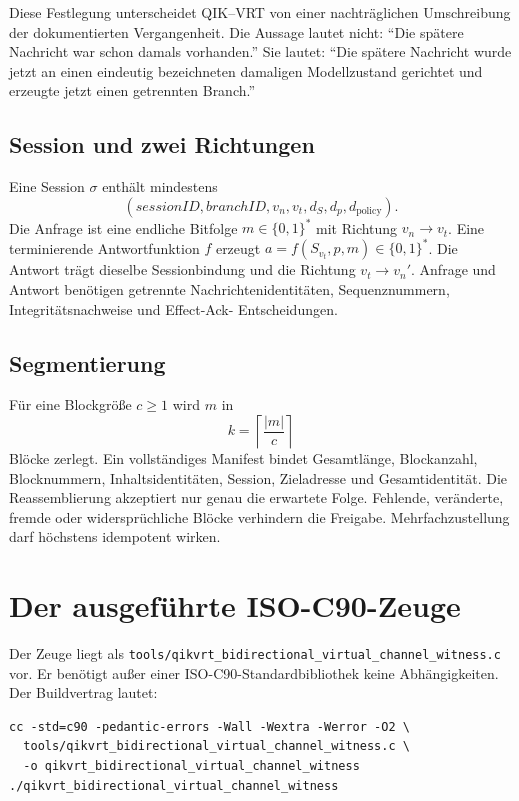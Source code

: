 \documentclass[11pt,a4paper]{article}
\theoremstyle{remark}
\newcommand{\bytes}{\{0,1\}^{*}}
\begin{document}
Diese Festlegung unterscheidet QIK--VRT von einer nachträglichen Umschreibung
der dokumentierten Vergangenheit. Die Aussage lautet nicht: ``Die spätere
Nachricht war schon damals vorhanden.'' Sie lautet: ``Die spätere Nachricht
wurde jetzt an einen eindeutig bezeichneten damaligen Modellzustand gerichtet
und erzeugte jetzt einen getrennten Branch.''

\subsection{Session und zwei Richtungen}

Eine Session \(\sigma\) enthält mindestens
\[
 (\mathit{sessionID},\mathit{branchID},v_n,v_t,
  d_S,d_p,d_{\mathrm{policy}}).
\]
Die Anfrage ist eine endliche Bitfolge \(m\in\bytes\) mit Richtung
\(v_n\rightarrow v_t\). Eine terminierende Antwortfunktion \(f\) erzeugt
\(a=f(S_{v_t},p,m)\in\bytes\). Die Antwort trägt dieselbe Sessionbindung und
die Richtung \(v_t\rightarrow v_n'\). Anfrage und Antwort benötigen getrennte
Nachrichtenidentitäten, Sequenznummern, Integritätsnachweise und Effect-Ack-
Entscheidungen.

\subsection{Segmentierung}

Für eine Blockgröße \(c\geq1\) wird \(m\) in
\[
 k=\left\lceil\frac{|m|}{c}\right\rceil
\]
Blöcke zerlegt. Ein vollständiges Manifest bindet Gesamtlänge, Blockanzahl,
Blocknummern, Inhaltsidentitäten, Session, Zieladresse und Gesamtidentität.
Die Reassemblierung akzeptiert nur genau die erwartete Folge. Fehlende,
veränderte, fremde oder widersprüchliche Blöcke verhindern die Freigabe.
Mehrfachzustellung darf höchstens idempotent wirken.

\section{Der ausgeführte ISO-C90-Zeuge}

Der Zeuge liegt als
\texttt{tools/qikvrt\_bidirectional\_virtual\_channel\_witness.c} vor. Er
benötigt außer einer ISO-C90-Standardbibliothek keine Abhängigkeiten. Der
Buildvertrag lautet:

\begin{Verbatim}[fontsize=\small]
cc -std=c90 -pedantic-errors -Wall -Wextra -Werror -O2 \
  tools/qikvrt_bidirectional_virtual_channel_witness.c \
  -o qikvrt_bidirectional_virtual_channel_witness
./qikvrt_bidirectional_virtual_channel_witness
\end{Verbatim}
\end{document}

